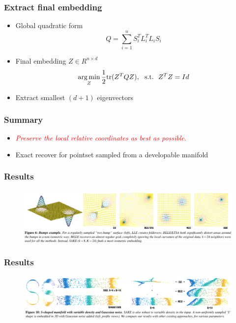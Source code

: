 \documentclass[serif,mathserif, 12pt]{beamer}
\newcommand{\TODO}[1]{\textcolor{red}{#1}}
\newcommand{\argmin}{\operatornamewithlimits{arg\min}}
\begin{document}
\begin{frame}
  \frametitle{Extract final embedding}
  \begin{itemize}
  \item Global quadratic form
    \begin{equation*}
      Q = \sum_{i = 1}^n S_i^TL_i^TL_iS_i
    \end{equation*}
  \item Final embedding $Z \in R^{n\times d}$
    \begin{equation*}
      \argmin_Z \frac{1}{2}\text{tr}(Z^TQZ), \text{~~s.t.~~} Z^TZ = Id
    \end{equation*}
  \item Extract smallest $(d+1)$ eigenvectors
  \end{itemize}
\end{frame}

\begin{frame}
  \frametitle{Summary}
  \begin{itemize}
  \item \emph{\TODO{Preserve the local relative coordinates as best as possible.}}
  \item Exact recover for pointset sampled from a developable manifold
  \end{itemize}
\end{frame}

\begin{frame}
  \frametitle{Results}
  \begin{figure}
    \centering
    \includegraphics[width=\textwidth]{img/bumps}
  \end{figure}
\end{frame}

\begin{frame}
  \frametitle{Results}
  \begin{figure}
    \centering
    \includegraphics[width=\textwidth]{img/s_shape}
  \end{figure}
\end{frame}
\end{document}
